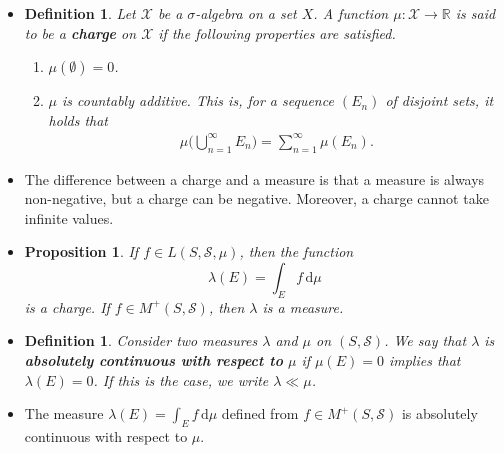 \documentclass[10pt]{article}
\newtheorem{definition}[lemma]{Definition}
\newtheorem{proposition}[lemma]{Proposition}
\newcommand{\dee}{\mathrm{d}}
\newcommand{\mcal}[1]{\mathcal{#1}}
\newcommand{\Real}{\mathbb{R}}
\begin{document}
\begin{itemize}
\begin{proposition}
\begin{enumerate}
      \item Let $A_1, A_2, \dotsc, A_n$ be disjoint sets such that $\bigcup_{i=1}^n A_i = S$. Then, for any $f \in L(S,\mcal{S},\mu)$, we have that
      \begin{align*}
        \int f\, \dee\mu = \sum_{i=1}^n \int_{A_i} f\, \dee\mu.
      \end{align*}

      \item If $f \in M^+(S,\mcal{S})$, then $f(x) = 0$ $\mu$-almost everywhere if and only if $\int f\, \dee\mu = 0$.      
    \end{enumerate}
  \end{proposition}

  \item \begin{definition}
    Let $\mcal{X}$ be a $\sigma$-algebra on a set $X$. A function $\mu: \mcal{X} \rightarrow 
    \Real$ is said to be a {\bf charge} on $\mcal{X}$ if the following properties are satisfied.
    \begin{enumerate}
      \item $\mu(\emptyset) = 0$.
      \item $\mu$ is countably additive. This is, for a sequence $(E_n)$ of disjoint sets, it holds that
      \begin{align*}
        \mu\bigg( \bigcup_{n=1}^\infty E_n \bigg) = \sum_{n=1}^\infty \mu(E_n).
      \end{align*}
    \end{enumerate}
  \end{definition}

  \item The difference between a charge and a measure is that a measure is always non-negative, but a charge can be negative. Moreover, a charge cannot take infinite values.

  \item \begin{proposition} \label{proposition:change-from-integral}
    If $f \in L(S,\mcal{S},\mu)$, then the function $$ \lambda(E) = \int_E f\, \dee\mu $$
    is a charge. If $f \in M^+(S,\mcal{S})$, then $\lambda$ is a measure.
  \end{proposition}

  \item \begin{definition}
    Consider two measures $\lambda$ and $\mu$ on $(S,\mcal{S})$. We say that $\lambda$ is {\bf absolutely continuous with respect to} $\mu$ if $\mu(E) = 0$ implies that $\lambda(E) = 0$. If this is the case, we write $\lambda \ll \mu$.
  \end{definition}

  \item The measure $\lambda(E) = \int_E f\,\dee\mu$ defined from $f \in M^+(S,\mcal{S})$ is absolutely continuous with respect to $\mu$.  
\end{itemize}
\end{document}
